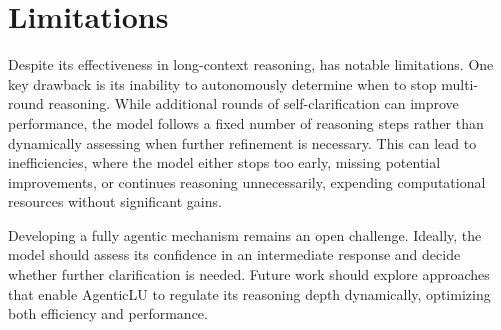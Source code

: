 \section*{Limitations}
Despite its effectiveness in long-context reasoning, \method has notable limitations. One key drawback is its inability to autonomously determine when to stop multi-round reasoning. While additional rounds of self-clarification can improve performance, the model follows a fixed number of reasoning steps rather than dynamically assessing when further refinement is necessary. This can lead to inefficiencies, where the model either stops too early, missing potential improvements, or continues reasoning unnecessarily, expending computational resources without significant gains.

Developing a fully agentic mechanism remains an open challenge. Ideally, the model should assess its confidence in an intermediate response and decide whether further clarification is needed. Future work should explore approaches that enable AgenticLU to regulate its reasoning depth dynamically, optimizing both efficiency and performance.